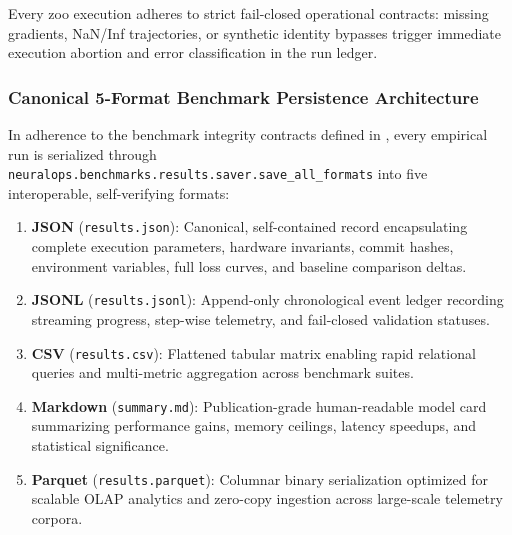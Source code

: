Every zoo execution adheres to strict fail-closed operational contracts: missing gradients, NaN/Inf trajectories, or synthetic identity bypasses trigger immediate execution abortion and error classification in the run ledger.

\subsubsection{Canonical 5-Format Benchmark Persistence Architecture}
\label{sec:setup_5format_persistence}
In adherence to the benchmark integrity contracts defined in \neuralops{}, every empirical run is serialized through \texttt{neuralops.benchmarks.results.saver.save\_all\_formats} into five interoperable, self-verifying formats:
\begin{enumerate}
    \item \textbf{JSON} (\texttt{results.json}): Canonical, self-contained record encapsulating complete execution parameters, hardware invariants, commit hashes, environment variables, full loss curves, and baseline comparison deltas.
    \item \textbf{JSONL} (\texttt{results.jsonl}): Append-only chronological event ledger recording streaming progress, step-wise telemetry, and fail-closed validation statuses.
    \item \textbf{CSV} (\texttt{results.csv}): Flattened tabular matrix enabling rapid relational queries and multi-metric aggregation across benchmark suites.
    \item \textbf{Markdown} (\texttt{summary.md}): Publication-grade human-readable model card summarizing performance gains, memory ceilings, latency speedups, and statistical significance.
    \item \textbf{Parquet} (\texttt{results.parquet}): Columnar binary serialization optimized for scalable OLAP analytics and zero-copy ingestion across large-scale telemetry corpora.
\end{enumerate}

